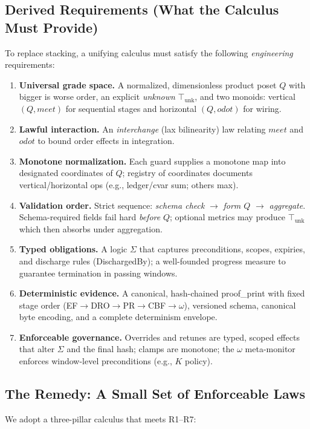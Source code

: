 \documentclass[11pt]{article}
\theoremstyle{plain}
\theoremstyle{definition}
\theoremstyle{remark}
\def\Q{Q}%
\def\Sig{\Sigma}%
\def\vmeet{meet}%
\def\hplus{odot}%
\def\code#1{#1}%
\DeclareRobustCommand{\Q}{\texorpdfstring{\ensuremath{\mathcal{Q}}}{Q}}     %
\DeclareRobustCommand{\Sig}{\texorpdfstring{\ensuremath{\Sigma}}{\Sigma}}   %
\newcommand{\unk}{\top_{\mathrm{unk}}}         %
\newcommand{\vmeet}{\wedge}                    %
\newcommand{\hplus}{\odot}                     %
\newcommand{\code}[1]{\texttt{\textup{#1}}}    %
\newcommand{\ledger}{\code{ledger}}
\newcommand{\cvar}{\code{cvar}}
\newcommand{\EF}{\textsc{EF}}
\newcommand{\DRO}{\textsc{DRO}}
\newcommand{\PR}{\textsc{PR}}
\newcommand{\CBF}{\textsc{CBF}}
\newcommand{\om}{\ensuremath{\omega}}
\def\Q{Q}%
\def\Sig{\Sigma}%
\def\vmeet{meet}%
\def\hplus{odot}%
\def\code#1{#1}%
\begin{document}
\subsection{Derived Requirements (What the Calculus Must Provide)}
To replace stacking, a unifying calculus must satisfy the following \emph{engineering} requirements:

\begin{enumerate}[label=R\arabic*., leftmargin=2.2em]
  \item \textbf{Universal grade space.} A normalized, dimensionless product poset $\Q$ with bigger is worse order, an explicit \emph{unknown} $\unk$, and two monoids: vertical $(\Q,\vmeet)$ for sequential stages and horizontal $(\Q,\hplus)$ for wiring.
  \item \textbf{Lawful interaction.} An \emph{interchange} (lax bilinearity) law relating $\vmeet$ and $\hplus$ to bound order effects in integration.
  \item \textbf{Monotone normalization.} Each guard supplies a monotone map into designated coordinates of $\Q$; registry of coordinates documents vertical/horizontal ops (e.g., \ledger/\cvar{} sum; others max).
  \item \textbf{Validation order.} Strict sequence: \emph{schema check} $\rightarrow$ \emph{form $\Q$} $\rightarrow$ \emph{aggregate}. Schema-required fields fail hard \emph{before} $\Q$; optional metrics may produce $\unk$ which then absorbs under aggregation.
  \item \textbf{Typed obligations.} A logic $\Sig$ that captures preconditions, scopes, expiries, and discharge rules (\code{DischargedBy}); a well-founded progress measure to guarantee termination in passing windows.
  \item \textbf{Deterministic evidence.} A canonical, hash-chained \code{proof\_print} with fixed stage order (\EF{}$\!\to$\DRO{}$\!\to$\PR{}$\!\to$\CBF{}$\!\to$\om), versioned schema, canonical byte encoding, and a complete determinism envelope.
  \item \textbf{Enforceable governance.} Overrides and retunes are typed, scoped effects that alter $\Sig$ and the final hash; clamps are monotone; the $\om$ meta-monitor enforces window-level preconditions (e.g., $K$ policy).
\end{enumerate}

\subsection{The Remedy: A Small Set of Enforceable Laws}
We adopt a three-pillar calculus that meets R1–R7:
\end{document}
